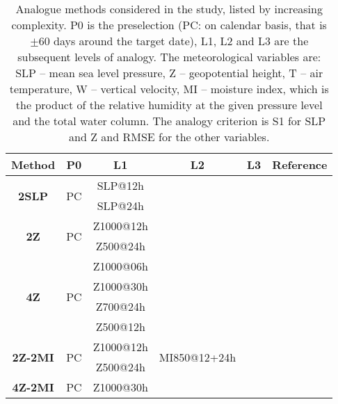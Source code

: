 \documentclass[smallextended]{svjour3}       %
\begin{document}
	
	
	
	
	\begin{table*}[t]
		\caption{Analogue methods considered in the study, listed by increasing complexity. P0 is the preselection (PC: on calendar basis, that is $\pm 60$ days around the target date), L1, L2 and L3 are the subsequent levels of analogy. The meteorological variables are: SLP -- mean sea level pressure, Z -- geopotential height, T -- air temperature, W -- vertical velocity, MI -- moisture index, which is the product of the relative humidity at the given pressure level and the total water column. The analogy criterion is S1 for SLP and Z and RMSE for the other variables.}
		\begin{center}
			\begin{tabular}{cccccl}
				\hline
				\textbf{Method} & \textbf{P0} & \textbf{L1} & \textbf{L2} & \textbf{L3} & \textbf{Reference} \\ 
				\hline 
				\multirow{2}{*}{\textbf{2SLP}} & \multirow{2}{*}{PC} & SLP@12h &&& \\
				&& SLP@24h &&& \\
				\hline 
				\multirow{2}{*}{\textbf{2Z}} & \multirow{2}{*}{PC} & Z1000@12h &&& \multirow{2}{*}{\citealt{Bontron2004}} \\
				&& Z500@24h &&& \\
				\hline 
				\multirow{4}{*}{\textbf{4Z}} & \multirow{4}{*}{PC} & Z1000@06h &&& \multirow{4}{*}{\citealt{Horton2017b}} \\
				&& Z1000@30h &&& \\
				&& Z700@24h &&& \\
				&& Z500@12h &&& \\
				\hline 
				\multirow{2}{*}{\textbf{2Z-2MI}} & \multirow{2}{*}{PC} & Z1000@12h & \multirow{2}{*}{MI850@12+24h} && \multirow{2}{*}{\citealt{Bontron2004}} \\
				&& Z500@24h &&& \\
				\hline 
				\multirow{4}{*}{\textbf{4Z-2MI}} & \multirow{4}{*}{PC} & Z1000@30h &&& \multirow{4}{*}{\citealt{Horton2017b}}\\

\end{tabular}
\end{center}
\end{table*}
\end{document}
